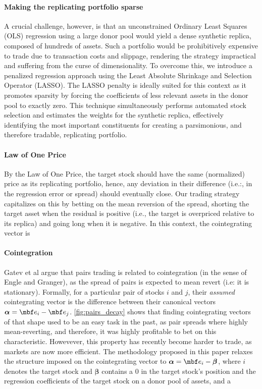 \paragraph{Making the replicating portfolio sparse}
A crucial challenge, however, is that an unconstrained Ordinary Least Squares (OLS) regression using a large donor pool would yield a dense synthetic replica, composed of hundreds of assets. Such a portfolio would be prohibitively expensive to trade due to transaction costs and slippage, rendering the strategy impractical and suffering from the curse of dimensionality. To overcome this, we introduce a penalized regression approach using the Least Absolute Shrinkage and Selection Operator (LASSO). The LASSO penalty is ideally suited for this context as it promotes sparsity by forcing the coefficients of less relevant assets in the donor pool to exactly zero. This technique simultaneously performs automated stock selection and estimates the weights for the synthetic replica, effectively identifying the most important constituents for creating a parsimonious, and therefore tradable, replicating portfolio. 

\paragraph{Law of One Price}
By the Law of One Price, the target stock should have the same (normalized) price as its replicating portfolio, hence, any deviation in their difference (i.e.:, in the regression error or spread) should eventually close. Our trading strategy capitalizes on this by betting on the mean reversion of the spread, shorting the target asset when the residual is positive (i.e., the target is overpriced relative to its replica) and going long when it is negative. In this context, the cointegrating vector is 

\paragraph{Cointegration}
Gatev et al argue that pairs trading is related to cointegration (in the sense of Engle and Granger), as the spread of pairs is expected to mean revert (i.e: it is stationary). Formally, for a particular pair of stocks $i$ and $j$, their \textit{assumed} cointegrating vector is the difference between their canonical vectors $\boldsymbol \alpha = \mbf e_i - \mbf e_j$. \cref{fig:pairs_decay} shows that finding cointegrating vectors of that shape used to be an easy task in the past, as pair spreads where highly mean-reverting, and therefore, it was highly profitable to bet on this characteristic. Howevever, this property has recently become harder to trade, as markets are now more efficient. The methodology proposed in this paper relaxes the structure imposed on the cointegrating vector to $\boldsymbol \alpha = \mbf e_i - \boldsymbol \beta$, where $i$ denotes the target stock and $\boldsymbol \beta$ contains a 0 in the target stock's position and the regression coefficients of the target stock on a donor pool of assets, and a 

